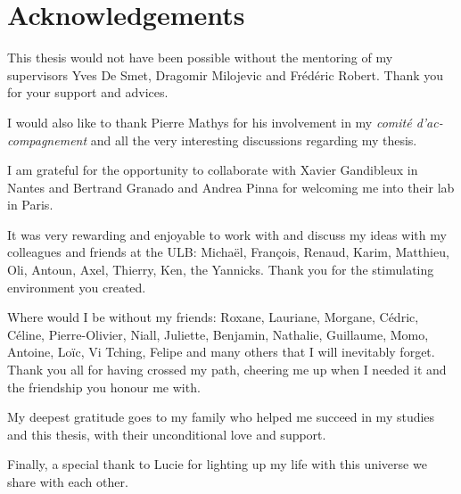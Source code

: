 \chapter{Acknowledgements}

This thesis would not have been possible without the mentoring of my supervisors Yves De Smet, Dragomir Milojevic and Frédéric Robert. Thank you for your support and advices.

I would also like to thank Pierre Mathys for his involvement in my \textit{comité d'ac-compagnement} and all the very interesting discussions regarding my thesis.

I am grateful for the opportunity to collaborate with Xavier Gandibleux in Nantes and Bertrand Granado and Andrea Pinna for welcoming me into their lab in Paris.

It was very rewarding and enjoyable to work with and discuss my ideas with my colleagues and friends at the ULB: Michaël, François, Renaud, Karim, Matthieu, Oli, Antoun, Axel, Thierry, Ken, the Yannicks. Thank you for the stimulating environment you created.

Where would I be without my friends: Roxane, Lauriane, Morgane, Cédric, Céline, Pierre-Olivier, Niall, Juliette, Benjamin, Nathalie, Guillaume, Momo, Antoine, Loïc, Vi Tching, Felipe and many others that I will inevitably forget. Thank you all for having crossed my path, cheering me up when I needed it and the friendship you honour me with.

My deepest gratitude goes to my family who helped me succeed in my studies and this thesis, with their unconditional love and support.

Finally, a special thank to Lucie for lighting up my life with this universe we share with each other.